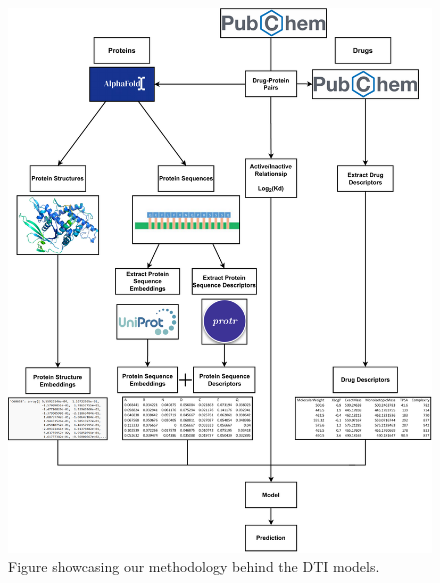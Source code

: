 \begin{figure}[!h]
    \centering
    \includegraphics[width=0.95\linewidth]{images/DTIs_Methodology.pdf}    
    \caption{Figure showcasing our methodology behind the DTI models.}
    \label{fig:DTIs_Methodology} 
\end{figure}